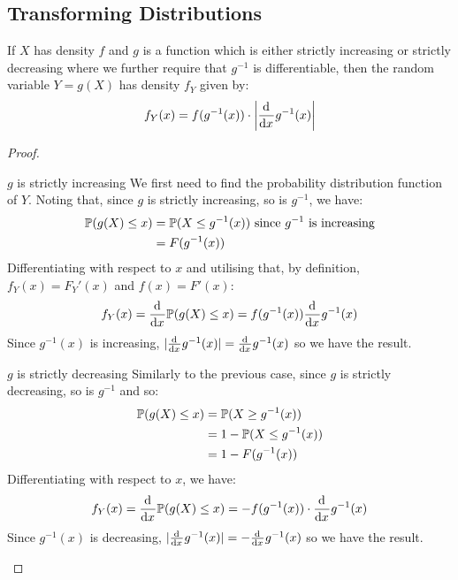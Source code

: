 \documentclass[../main.tex]{subfiles}
\begin{document}
\subsection{Transforming Distributions}
\begin{theorem}
  If $X$ has density $f$ and $g$ is a function which is either strictly increasing or strictly decreasing where we further require that $g^{-1}$ is differentiable, then the random variable $Y = g(X)$ has density $f_Y$ given by:
  \label{transformingDistributions}
  \[
    f_{Y}(x) = f(g^{-1}(x)) \cdot \abs{\deriv{}{x} g^{-1}(x)}
  \]
\end{theorem}
\begin{proof}
  \begin{proofcases}
    \begin{case}{$g$ is strictly increasing}
      We first need to find the probability distribution function of $Y$.
      Noting that, since $g$ is strictly increasing, so is $g^{-1}$, we have:
      \begin{align*}
        \P(g(X) \leq x) &= \P(X \leq g^{-1}(x)) \text{ since $g^{-1}$ is increasing}\\
                     &= F(g^{-1}(x))
      \end{align*}
      Differentiating with respect to $x$ and utilising that, by definition, $f_Y(x) = F_Y'(x)$ and $f(x) = F'(x)$:
      \[
        f_{Y}(x) = \deriv{}{x}\P(g(X) \leq x) = f(g^{-1}(x)) \deriv{}{x} g^{-1}(x)
      \]
      Since $g^{-1}(x)$ is increasing, $|\deriv{}{x}g^{-1}(x)| = \deriv{}{x}g^{-1}(x)$ so we have the result.
    \end{case}
    \begin{case}{$g$ is strictly decreasing}
      Similarly to the previous case, since $g$ is strictly decreasing, so is $g^{-1}$ and so:
      \begin{align*}
        \P(g(X) \leq x) &= \P(X \geq g^{-1}(x)) \\
                        &= 1 - \P(X \leq g^{-1}(x)) \\
                        &= 1 - F(g^{-1}(x))
      \end{align*}
      Differentiating with respect to $x$, we have:
      \[
        f_{Y}(x) = \deriv{}{x}\P(g(X) \leq x) = -f(g^{-1}(x)) \cdot \deriv{}{x} g^{-1}(x)
      \]
      Since $g^{-1}(x)$ is decreasing, $|\deriv{}{x}g^{-1}(x)| = - \deriv{}{x}g^{-1}(x)$ so we have the result.
    \end{case}
  \end{proofcases}
\end{proof}
\end{document}
